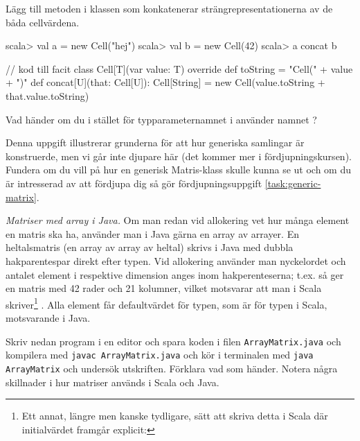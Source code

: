\Subtask Lägg till metoden  i klassen  som konkatenerar strängrepresentationerna av de båda cellvärdena.

\begin{REPL}
scala> val a = new Cell("hej")
scala> val b = new Cell(42)
scala> a concat b
\end{REPL}

\begin{Code}
// kod till facit
class Cell[T](var value: T){
  override def toString = "Cell(" + value + ")"
  def concat[U](that: Cell[U]): Cell[String] = 
    new Cell(value.toString + that.value.toString)
}
\end{Code}

\Subtask\Pen Vad händer om du i stället för typparameternamnet  i  använder namnet ?

\Subtask\Pen Denna uppgift illustrerar grunderna för att hur generiska samlingar är konstruerde, men vi går inte djupare här (det kommer mer i fördjupningskursen). Fundera om du vill på hur en generisk Matris-klass skulle kunna se ut och om du är intresserad av att fördjupa dig så gör fördjupningsuppgift \ref{task:generic-matrix}. 





\Task \label{task:arraymatrix-java} \emph{Matriser med array i Java.} Om man redan vid allokering vet hur många element en matris ska ha, använder man i Java gärna en array av arrayer. En heltalsmatris (en array av array av heltal) skrivs i Java med dubbla hakparentespar  direkt efter typen. Vid allokering använder man nyckelordet  och antalet element i respektive dimension anges inom hakperenteserna; t.ex. så ger  en matris med 42 rader och 21 kolumner, vilket motsvarar att man i Scala skriver\footnote{Ett annat, längre men kanske tydligare, sätt att skriva detta i Scala där initialvärdet framgår explicit: }  . Alla element får defaultvärdet för typen, som är  för typen  i Scala, motsvarande  i Java.

\Subtask Skriv nedan program i en editor och spara koden i filen \texttt{ArrayMatrix.java} och kompilera med \texttt{javac ArrayMatrix.java} och kör i terminalen med \texttt{java ArrayMatrix} och undersök utskriften. Förklara vad som händer. Notera några skillnader i hur matriser används i Scala och Java.


